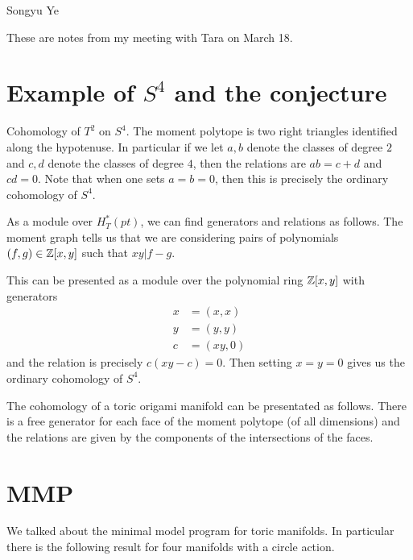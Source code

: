 \documentclass[12pt]{article}
\begin{document}
Songyu Ye

These are notes from my meeting with Tara on March 18.

\section{Example of $S^4$ and the conjecture}

\begin{example}
    Cohomology of $T^2$ on $S^4$. The moment polytope is two right triangles identified along the hypotenuse. 
    In particular if we let $a,b$ denote the classes of degree
    $2$ and $c,d$ denote the classes of degree $4$, then the relations are $ab = c + d$ and $cd = 0$.
    Note that when one sets $a = b = 0$, then this is precisely the ordinary cohomology of $S^4$.

    \hfill

    As a module over $H_T^*(pt)$, we can find generators and relations as follows. The moment graph
    tells us that we are considering pairs of polynomials $(f,g)\in \mathbb{Z}[x,y]$ such that $xy\vert f-g$.

    \hfill

    This can be presented as a module over the polynomial ring $\mathbb{Z}[x,y]$ with generators \begin{align*}
        x &= (x,x) \\
        y &= (y,y) \\
        c &= (xy,0)
    \end{align*} and the relation is precisely $c(xy-c) = 0$. Then setting $x = y = 0$ gives us the ordinary cohomology of $S^4$.
\end{example}

\begin{conjecture}
    The cohomology of a toric origami manifold can be presentated as follows. There is a 
    free generator for each face of the moment polytope (of all dimensions) and the relations are given by the
    components of the intersections of the faces.
\end{conjecture}

\section{MMP}
We talked about the minimal model program for toric manifolds. In particular there is the following result for 
four manifolds with a circle action. 
\end{document}
